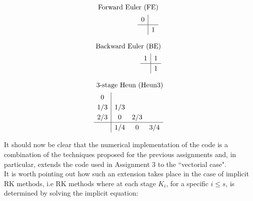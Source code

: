\documentclass[11pt]{article}
\theoremstyle{theorem}
\theoremstyle{definition}
\begin{document}
\begin{center}
	\begin{minipage}{0.3\linewidth}
		\begin{align*}
		\renewcommand\arraystretch{1.2}
		\textnormal{Forward Euler (FE)} \\
		\begin{array}
		{c|c}
		0 &
		\\
		\hline
		& 1
		\end{array}
		\end{align*}
	\end{minipage}
	\begin{minipage}{0.3\linewidth}
		\begin{align*}
		\renewcommand\arraystretch{1.2}
		\textnormal{Backward Euler (BE)} \\
		\begin{array}
		{c|c}
		1 & 1
		\\
		\hline
		& 1
		\end{array}
		\end{align*}
	\end{minipage}
	\begin{minipage}{0.3\linewidth}
		\begin{align*}
		\renewcommand\arraystretch{1.2}
		\textnormal{3-stage Heun (Heun3)} \\
		\begin{array}
		{c|ccc}
		0 & & \\
		1/3 & 1/3 & \\
		2/3 & 0 & 2/3 \\
		\hline
		& 1/4 & 0 & 3/4
		\end{array}
		\end{align*}
	\end{minipage}
\end{center}

It should now be clear that the numerical implementation of the code is a combination of the techniques proposed for the previous assignments and, in particular, extends the code used in Assignment 3 to the ``vectorial case".\\
It is worth pointing out how such an extension takes place in the case of implicit RK methods, i.e RK methods where at each stage $ K_i $, for a specific $ i \leq s $, is determined by solving the implicit equation:
\end{document}
